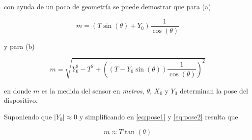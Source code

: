 \documentclass[10pt,conference,a4paper,onecolumn]{article}%
\begin{document}
con ayuda de un poco de geometría se puede demostrar que para (a) 

\begin{equation}
m= \left( T\sin(\theta) + Y_0 \right) \frac{1}{\cos(\theta)}
\label{eq:pose1}
\end{equation}

y para (b)

\begin{equation}
m=\sqrt{Y_0^2 - T^2 + \left((T-Y_0\sin(\theta))\frac{1}{\cos(\theta)} \right)^2}
\label{eq:pose2}
\end{equation}

en donde $m$ es la medida del sensor en \textit{metros}, $\theta$, $X_0$ y $Y_0$ determinan la pose del dispositivo. 

Suponiendo que $ | Y_0 | \approx 0$ y simplificando en \ref{eq:pose1} y \ref{eq:pose2}  resulta que

\begin{equation}
m \approx T \tan(\theta)
\end{equation} 


\end{document}
